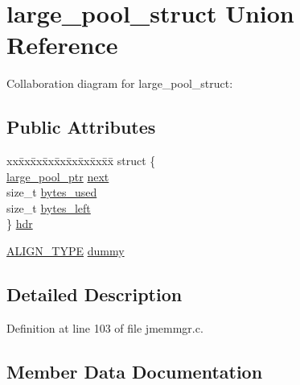 \hypertarget{unionlarge__pool__struct}{}\section{large\+\_\+pool\+\_\+struct Union Reference}
\label{unionlarge__pool__struct}


Collaboration diagram for large\+\_\+pool\+\_\+struct\+:
\subsection*{Public Attributes}
\begin{DoxyCompactItemize}
\item 
\begin{tabbing}
xx\=xx\=xx\=xx\=xx\=xx\=xx\=xx\=xx\=\kill
struct \{\\
\>\mbox{\hyperlink{jmemmgr_8c_a048418eab2b2022aaa4ec587c48a3089}{large\_pool\_ptr}} \mbox{\hyperlink{unionlarge__pool__struct_af4e2c26179563b175cd134ace99767cf}{next}}\\
\>size\_t \mbox{\hyperlink{unionlarge__pool__struct_a6a809a92d1775c242eba37daabaa4b3b}{bytes\_used}}\\
\>size\_t \mbox{\hyperlink{unionlarge__pool__struct_ab7106ede30ea9d887b1a3620afc1bf6a}{bytes\_left}}\\
\} \mbox{\hyperlink{unionlarge__pool__struct_a92556ba164f9d34c437bd80207c2a29f}{hdr}}\\

\end{tabbing}\item 
\mbox{\hyperlink{jmemmgr_8c_a4781c052bb138f69ef6d60737fd569e3}{A\+L\+I\+G\+N\+\_\+\+T\+Y\+PE}} \mbox{\hyperlink{unionlarge__pool__struct_a850fcb897c7fbfb12dd01193fa0c48aa}{dummy}}
\end{DoxyCompactItemize}


\subsection{Detailed Description}


Definition at line 103 of file jmemmgr.\+c.



\subsection{Member Data Documentation}
\mbox{\label{unionlarge__pool__struct_ab7106ede30ea9d887b1a3620afc1bf6a}} 
